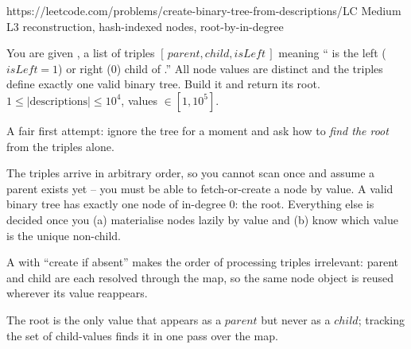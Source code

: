   {https://leetcode.com/problems/create-binary-tree-from-descriptions/}{LC Medium L3}
  {reconstruction, hash-indexed nodes, root-by-in-degree}

\begin{problemstatement}
You are given , a list of triples $[\,\mathit{parent},\mathit{child},
\mathit{isLeft}\,]$ meaning `` is the left ($\mathit{isLeft}=1$) or right
($0$) child of .'' All node values are distinct and the triples define
exactly one valid binary tree. Build it and return its root. $1\le|\text{descriptions}|\le10^{4}$,
values $\in[1,10^{5}]$.
\end{problemstatement}

\begin{attemptgate}
A fair first attempt: ignore the tree for a moment and ask how to \emph{find the
root} from the triples alone.
\end{attemptgate}

The triples arrive in arbitrary order, so you cannot scan once and assume a parent
exists yet -- you must be able to fetch-or-create a node by value. A valid binary
tree has exactly one node of in-degree $0$: the root. Everything else is decided
once you (a) materialise nodes lazily by value and (b) know which value is the
unique non-child.

\begin{observation}
A  with ``create if absent'' makes the order of
processing triples irrelevant: parent and child are each resolved through the map,
so the same node object is reused wherever its value reappears.
\end{observation}
\begin{observation}
The root is the only value that appears as a $\mathit{parent}$ but never as a
$\mathit{child}$; tracking the set of child-values finds it in one pass over the map.
\end{observation}

